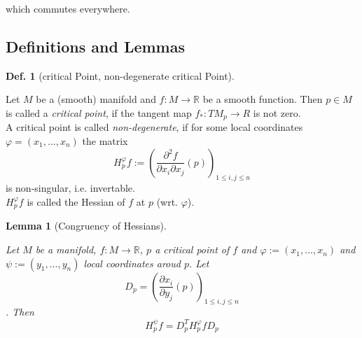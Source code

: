 \documentclass{article}
\theoremstyle{plain}
\theoremstyle{plain}
\theoremstyle{plain}
\newtheorem{lemma}{Lemma}[subsection]
\theoremstyle{definition}
\newtheorem{definition}{Def.}[subsection]
\theoremstyle{remark}
\begin{document}
which commutes everywhere.

\subsection{Definitions and Lemmas}

\begin{definition}[critical Point, non-degenerate critical Point]
   \label{def:critical point}

   Let $M$ be a (smooth) manifold and $f: M \rightarrow \mathbb{R}$ be a smooth function.
   Then $p \in M$ is called a \textit{critical point}, if the tangent map 
   $f_*: TM_p \rightarrow R$ is not zero. \\
   A critical point is called \textit{non-degenerate}, if for some local coordinates $\varphi = (x_1, ..., x_n)$
   the matrix 
   \[ H_p^{\varphi}f := \left(\frac{\partial^2 f}{\partial x_i \partial x_j}(p)\right)_{1 \leq i,j \leq n} \]
   is non-singular, i.e. invertable. \\
   $H_p^{\varphi}f$ is called the Hessian of $f$ at $p$ (wrt. $\varphi$).

\end{definition}

\begin{lemma}[Congruency of Hessians]
   \label{lemma:congruency}   

   Let $M$ be a manifold, $f: M \rightarrow \mathbb{R}$, $p$ a critical point of $f$
   and $\varphi := (x_1, ..., x_n)$ and $\psi := (y_1, ..., y_n)$ local coordinates
   aroud $p$. Let 
   \[ D_p = \left( \frac{\partial x_i}{\partial y_j}(p) \right)_{1 \leq i, j \leq n}\].
   Then 
   \[ H_p^{\psi}f = D_p^T H_p^{\varphi}f D_p \]

\end{lemma}
\end{document}
